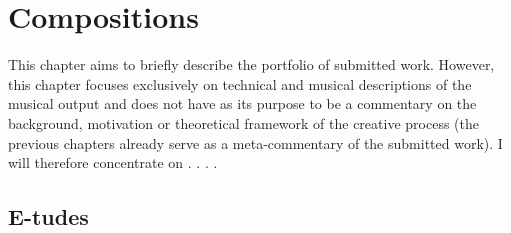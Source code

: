 \hypertarget{chapter7}{}
\chapter{Compositions}

This chapter aims to briefly describe the portfolio of submitted work. However, this chapter focuses exclusively on technical and musical descriptions of the musical output and does not have as its purpose to be a commentary on the background, motivation or theoretical framework of the creative process (the previous chapters already serve as a meta-commentary of the submitted work). I will therefore concentrate on . . . .


\section{E-tudes}

